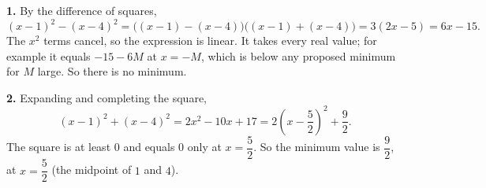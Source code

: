 \textbf{1.} By the difference of squares,
\[
(x-1)^2-(x-4)^2=\big((x-1)-(x-4)\big)\big((x-1)+(x-4)\big)=3(2x-5)=6x-15 .
\]
The $x^2$ terms cancel, so the expression is linear. It takes every real value; for example it equals $-15-6M$ at $x=-M$, which is below any proposed minimum for $M$ large. So there is no minimum.

\textbf{2.} Expanding and completing the square,
\[
(x-1)^2+(x-4)^2=2x^2-10x+17=2\left(x-\dfrac{5}{2}\right)^2+\dfrac{9}{2} .
\]
The square is at least $0$ and equals $0$ only at $x=\dfrac{5}{2}$. So the minimum value is $\boxed{\dfrac{9}{2}}$, at $x=\dfrac{5}{2}$ (the midpoint of $1$ and $4$).
